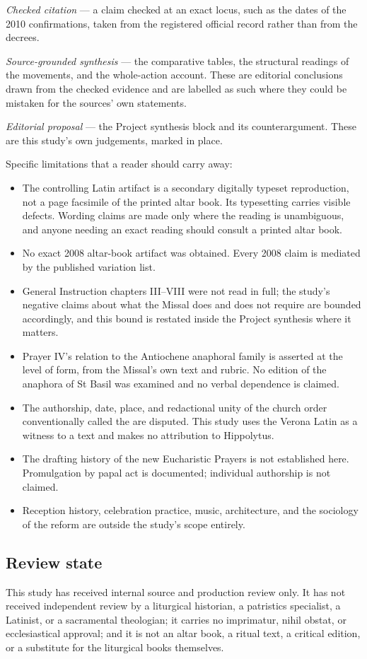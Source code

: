 \emph{Checked citation} --- a claim checked at an exact locus, such as the dates of the 2010
confirmations, taken from the registered official record rather than from the decrees.

\emph{Source-grounded synthesis} --- the comparative tables, the structural readings of the
movements, and the whole-action account. These are editorial conclusions drawn from the checked
evidence and are labelled as such where they could be mistaken for the sources' own statements.

\emph{Editorial proposal} --- the Project synthesis block and its counterargument. These are
this study's own judgements, marked in place.

Specific limitations that a reader should carry away:

\begin{itemize}[itemsep=0.15em]
\item The controlling Latin artifact is a secondary digitally typeset reproduction, not a page
facsimile of the printed altar book. Its typesetting carries visible defects. Wording claims are
made only where the reading is unambiguous, and anyone needing an exact reading should consult a
printed altar book.
\item No exact 2008 altar-book artifact was obtained. Every 2008 claim is mediated by the
published variation list.
\item General Instruction chapters III--VIII were not read in full; the study's negative claims
about what the Missal does and does not require are bounded accordingly, and this bound is
restated inside the Project synthesis where it matters.
\item Prayer IV's relation to the Antiochene anaphoral family is asserted at the level of form,
from the Missal's own text and rubric. No edition of the anaphora of St Basil was examined and
no verbal dependence is claimed.
\item The authorship, date, place, and redactional unity of the church order conventionally
called the  are disputed. This study uses the Verona Latin as a
witness to a text and makes no attribution to Hippolytus.
\item The drafting history of the new Eucharistic Prayers is not established here. Promulgation
by papal act is documented; individual authorship is not claimed.
\item Reception history, celebration practice, music, architecture, and the sociology of the
reform are outside the study's scope entirely.
\end{itemize}

\subsection*{Review state}

This study has received internal source and production review only. It has not received
independent review by a liturgical historian, a patristics specialist, a Latinist, or a
sacramental theologian; it carries no imprimatur, nihil obstat, or ecclesiastical approval; and
it is not an altar book, a ritual text, a critical edition, or a substitute for the liturgical
books themselves.
